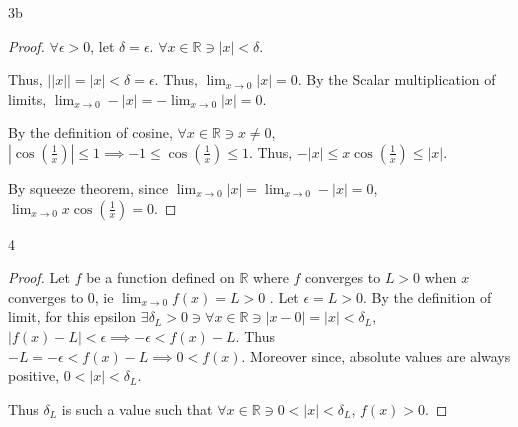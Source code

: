 \documentclass{article}
\newcommand{\R}{\mathbb{R}}
\newcommand{\abs}[1]{\left\lvert #1\right\rvert}
\begin{document}
\begin{PROB}{3b}\label{Problem 3b.}
\end{PROB}
\begin{proof}
    $\forall \epsilon > 0$, let $\delta = \epsilon$. $\forall x \in \R \ni \abs{x} < \delta$. 
    
    Thus, $\abs{\abs{x}} = \abs{x} < \delta = \epsilon$. Thus, $\lim_{x \to 0} \abs{x} = 0$. By the Scalar multiplication of limits, $\lim_{x \to 0} -\abs{x} = -\lim_{x \to 0} \abs{x} = 0$. 
    
    By the definition of cosine, $\forall x \in \R \ni x \neq 0$, $\abs{\cos\left(\frac{1}{x}\right)} \leq 1 \implies -1 \leq \cos(\frac{1}{x}) \leq 1$. Thus, $-\abs{x} \leq x \cos(\frac{1}{x}) \leq \abs{x}$.
    
    By squeeze theorem, since $\lim_{x \to 0} \abs{x} = \lim_{x \to 0} -\abs{x} = 0$, $\lim_{x \to 0} x \cos(\frac{1}{x}) = 0$.   
\end{proof}

\bigskip

\begin{PROB}{4}\label{Problem 4.}
\end{PROB}
\begin{proof}
    Let $f$ be a function defined on $\R$ where $f$ converges to $L > 0$ when $x$ converges to 0, ie $\lim_{x \to 0} f(x) = L > 0$ .
    Let $\epsilon = L > 0$. By the definition of limit, for this epsilon $\exists \delta_{L} > 0 \ni \forall x \in \R \ni \abs{x - 0} = \abs{x} < \delta_{L}$, $\abs{f(x) - L} < \epsilon \implies -\epsilon < f(x) - L$. Thus $-L = -\epsilon < f(x) - L \implies 0 < f(x)$. Moreover since, absolute values are always positive, $0 < \abs{x} < \delta_{L}$. 

    Thus $\delta_L$ is such a value such that $\forall x \in \R \ni 0 < \abs{x} < \delta_L$, $f(x) > 0$.    
\end{proof}
\end{document}
